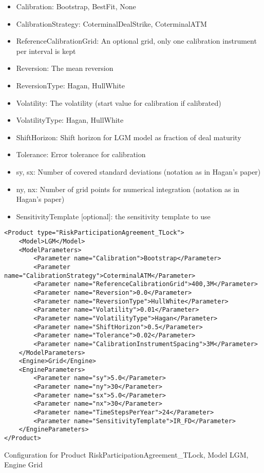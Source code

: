 \begin{itemize}
\item Calibration: Bootstrap, BestFit, None
\item CalibrationStrategy: CoterminalDealStrike, CoterminalATM
\item ReferenceCalibrationGrid: An optional grid, only one calibration instrument per interval is kept
\item Reversion: The mean reversion
\item ReversionType: Hagan, HullWhite
\item Volatility: The volatility (start value for calibration if calibrated)
\item VolatilityType: Hagan, HullWhite
\item ShiftHorizon: Shift horizon for LGM model as fraction of deal maturity
\item Tolerance: Error tolerance for calibration
\item sy, sx: Number of covered standard deviations (notation as in Hagan's paper)
\item ny, nx: Number of grid points for numerical integration (notation as in Hagan's paper)
\item SensitivityTemplate [optional]: the sensitivity template to use 
\end{itemize}

\begin{longlisting}
\begin{verbatim}
<Product type="RiskParticipationAgreement_TLock">
    <Model>LGM</Model>
    <ModelParameters>
        <Parameter name="Calibration">Bootstrap</Parameter>
        <Parameter name="CalibrationStrategy">CoterminalATM</Parameter>
        <Parameter name="ReferenceCalibrationGrid">400,3M</Parameter>
        <Parameter name="Reversion">0.0</Parameter>
        <Parameter name="ReversionType">HullWhite</Parameter>
        <Parameter name="Volatility">0.01</Parameter>
        <Parameter name="VolatilityType">Hagan</Parameter>
        <Parameter name="ShiftHorizon">0.5</Parameter>
        <Parameter name="Tolerance">0.02</Parameter>
        <Parameter name="CalibrationInstrumentSpacing">3M</Parameter>
    </ModelParameters>
    <Engine>Grid</Engine>
    <EngineParameters>
        <Parameter name="sy">5.0</Parameter>
        <Parameter name="ny">30</Parameter>
        <Parameter name="sx">5.0</Parameter>
        <Parameter name="nx">30</Parameter>
        <Parameter name="TimeStepsPerYear">24</Parameter>
        <Parameter name="SensitivityTemplate">IR_FD</Parameter>
    </EngineParameters>
</Product>
\end{verbatim}
\caption{Configuration for Product RiskParticipationAgreement\_TLock, Model LGM, Engine Grid}
\label{lst:peconfig_RiskParticipationAgreement_TLock_LGM_Grid}
\end{longlisting}


